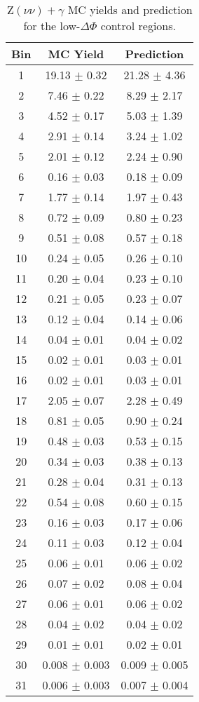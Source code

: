 \begin{table}
\centering
\caption{Z$(\nu\nu)+\gamma$ MC yields and prediction for the low-$\Delta\Phi$ control
regions.}
\label{tab:znnLDPPredictions}
\begin{tabular}{c|c|c}
Bin  & MC Yield & Prediction \\ \hline\hline
1 & 19.13  $\pm$  0.32  & 21.28 $\pm$ 4.36    \\\hline
2 & 7.46  $\pm$  0.22  & 8.29 $\pm$ 2.17    \\\hline
3 & 4.52  $\pm$  0.17  & 5.03 $\pm$ 1.39    \\\hline
4 & 2.91  $\pm$  0.14  & 3.24 $\pm$ 1.02    \\\hline
5 & 2.01  $\pm$  0.12  & 2.24 $\pm$ 0.90    \\\hline
6 & 0.16  $\pm$  0.03  & 0.18 $\pm$ 0.09    \\\hline
7 & 1.77  $\pm$  0.14  & 1.97 $\pm$ 0.43    \\\hline
8 & 0.72  $\pm$  0.09  & 0.80 $\pm$ 0.23    \\\hline
9 & 0.51  $\pm$  0.08  & 0.57 $\pm$ 0.18    \\\hline
10 & 0.24  $\pm$  0.05  & 0.26 $\pm$ 0.10    \\\hline
11 & 0.20  $\pm$  0.04  & 0.23 $\pm$ 0.10    \\\hline
12 & 0.21  $\pm$  0.05  & 0.23 $\pm$ 0.07    \\\hline
13 & 0.12  $\pm$  0.04  & 0.14 $\pm$ 0.06    \\\hline
14 & 0.04  $\pm$  0.01  & 0.04 $\pm$ 0.02    \\\hline
15 & 0.02  $\pm$  0.01  & 0.03 $\pm$ 0.01    \\\hline
16 & 0.02  $\pm$  0.01  & 0.03 $\pm$ 0.01    \\\hline
17 & 2.05  $\pm$  0.07  & 2.28 $\pm$ 0.49    \\\hline
18 & 0.81  $\pm$  0.05  & 0.90 $\pm$ 0.24    \\\hline
19 & 0.48  $\pm$  0.03  & 0.53 $\pm$ 0.15    \\\hline
20 & 0.34  $\pm$  0.03  & 0.38 $\pm$ 0.13    \\\hline
21 & 0.28  $\pm$  0.04  & 0.31 $\pm$ 0.13    \\\hline
22 & 0.54  $\pm$  0.08  & 0.60 $\pm$ 0.15    \\\hline
23 & 0.16  $\pm$  0.03  & 0.17 $\pm$ 0.06    \\\hline
24 & 0.11  $\pm$  0.03  & 0.12 $\pm$ 0.04    \\\hline
25 & 0.06  $\pm$  0.01  & 0.06 $\pm$ 0.02    \\\hline
26 & 0.07  $\pm$  0.02  & 0.08 $\pm$ 0.04    \\\hline
27 & 0.06  $\pm$  0.01  & 0.06 $\pm$ 0.02    \\\hline
28 & 0.04  $\pm$  0.02  & 0.04 $\pm$ 0.02    \\\hline
29 & 0.01  $\pm$  0.01  & 0.02 $\pm$ 0.01    \\\hline
30 & 0.008  $\pm$  0.003  & 0.009 $\pm$ 0.005    \\\hline
31 & 0.006  $\pm$  0.003  & 0.007 $\pm$ 0.004    \\\hline
\end{tabular}
\end{table}
